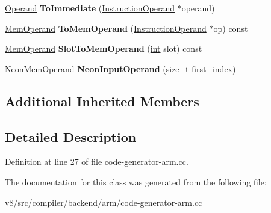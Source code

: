 \begin{DoxyCompactItemize}
\item 
\mbox{\label{classv8_1_1internal_1_1compiler_1_1ArmOperandConverter_abf03c9678cdc752795e15a64589d9b4d}} 
\mbox{\hyperlink{classv8_1_1internal_1_1Operand}{Operand}} {\bfseries To\+Immediate} (\mbox{\hyperlink{classv8_1_1internal_1_1compiler_1_1InstructionOperand}{Instruction\+Operand}} $\ast$operand)
\item 
\mbox{\label{classv8_1_1internal_1_1compiler_1_1ArmOperandConverter_a8956cef47b3734ce15ca3afb987dcc2d}} 
\mbox{\hyperlink{classv8_1_1internal_1_1MemOperand}{Mem\+Operand}} {\bfseries To\+Mem\+Operand} (\mbox{\hyperlink{classv8_1_1internal_1_1compiler_1_1InstructionOperand}{Instruction\+Operand}} $\ast$op) const
\item 
\mbox{\label{classv8_1_1internal_1_1compiler_1_1ArmOperandConverter_a24691d09efe3cccf63c1d1b9e2f20e1c}} 
\mbox{\hyperlink{classv8_1_1internal_1_1MemOperand}{Mem\+Operand}} {\bfseries Slot\+To\+Mem\+Operand} (\mbox{\hyperlink{classint}{int}} slot) const
\item 
\mbox{\label{classv8_1_1internal_1_1compiler_1_1ArmOperandConverter_a0ba85900c0cca90fdf34a9b360d06f4d}} 
\mbox{\hyperlink{classv8_1_1internal_1_1NeonMemOperand}{Neon\+Mem\+Operand}} {\bfseries Neon\+Input\+Operand} (\mbox{\hyperlink{classsize__t}{size\+\_\+t}} first\+\_\+index)
\end{DoxyCompactItemize}
\subsection*{Additional Inherited Members}


\subsection{Detailed Description}


Definition at line 27 of file code-\/generator-\/arm.\+cc.



The documentation for this class was generated from the following file\+:\begin{DoxyCompactItemize}
\item 
v8/src/compiler/backend/arm/code-\/generator-\/arm.\+cc\end{DoxyCompactItemize}
